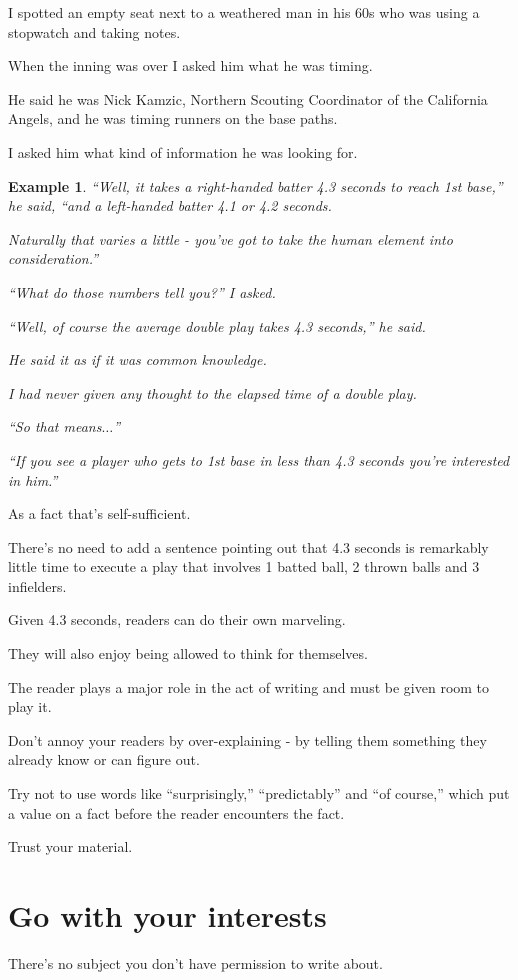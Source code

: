 \documentclass{book}
\numberwithin{equation}{section}
\newtheorem{example}{Example}[chapter]
\begin{document}
I spotted an empty seat next to a weathered man in his 60s who was using a stopwatch and taking notes.

When the inning was over I asked him what he was timing.

He said he was Nick Kamzic, Northern Scouting Coordinator of the California Angels, and he was timing runners on the base paths.

I asked him what kind of information he was looking for.
\begin{example}
    ``Well, it takes a right-handed batter 4.3 seconds to reach 1st base,'' he said, ``and a left-handed batter 4.1 or 4.2 seconds.
    
    Naturally that varies a little - you've got to take the human element into consideration.''
    
    ``What do those numbers tell you?'' I asked.
    
    ``Well, of course the average double play takes 4.3 seconds,'' he said.
    
    He said it as if it was common knowledge.
    
    I had never given any thought to the elapsed time of a double play.
    
    ``So that means$\ldots$''
    
    ``If you see a player who gets to 1st base in less than 4.3 seconds you're interested in him.''
\end{example}
As a fact that's self-sufficient.

There's no need to add a sentence pointing out that 4.3 seconds is remarkably little time to execute a play that involves 1 batted ball, 2 thrown balls and 3 infielders.

Given 4.3 seconds, readers can do their own marveling.

They will also enjoy being allowed to think for themselves.

The reader plays a major role in the act of writing and must be given room to play it.

Don't annoy your readers by over-explaining - by telling them something they already know or can figure out.

Try not to use words like ``surprisingly,'' ``predictably'' and ``of course,'' which put a value on a fact before the reader encounters the fact.

Trust your material.

\section{Go with your interests}
There's no subject you don't have permission to write about.
\end{document}
